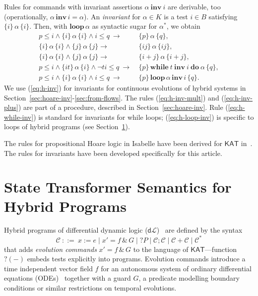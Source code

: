 \documentclass[envcountsame,envcountsect]{llncs}
\newcommand{\WHILEI}[3]{\mathbf{while}\ #1\ \mathbf{inv}\ #2\ \mathbf{do}\ #3}
\newcommand{\KAT}{\mathsf{KAT}}
\newcommand{\dL}{\mathsf{d}\mathcal{L}}
\begin{document}
Rules for commands with invariant assertions $\alpha\ \mathbf{inv}\ i$
are derivable, too (operationally,
$\alpha\, \mathbf{inv}\, i = \alpha$).  An \emph{invariant} for
$\alpha\in K$ is a test $i\in B$ satisfying $\{i\}\, \alpha\, \{i\}$.
Then, with $\mathbf{loop}\, \alpha$ as syntactic sugar for
$\alpha^\ast$, we obtain
\begin{align}
  p\le i \land \{i\}\, \alpha\, \{i\}\land i\le q\ \rightarrow\
  &\{p\}\, \alpha\, \{q\},\label{eq:h-inv}\tag{h-inv}\\
  \{i\}\, \alpha\, \{i\} \land \{j\}\, \alpha\, \{j\}\rightarrow\
  &\{i j\}\, \alpha\, \{i j\},\label{eq:h-inv-mult}\tag{h-inv-mult}\\
  \{i\}\, \alpha\, \{i\} \land \{j\}\, \alpha\, \{j\}\rightarrow\
  &\{i+ j\}\, \alpha\, \{i+ j\},\label{eq:h-inv-plus}\tag{h-inv-plus}\\
  p \le i \wedge \{it\}\, \alpha\, \{i\} \wedge \neg t i\le q\
  \rightarrow \ & \{p\}\, \WHILEI{t}{i}{\alpha}\,  \{q\},\label{eq:h-while-inv}\tag{h-while-inv}\\
   p\le i \land \{i\}\, \alpha\, \{i\}\land i\le q\ \rightarrow\ &
                                                                   \{p\}\, \mathbf{loop}\, \alpha\,
    \mathbf{inv}\, i\, \{q\}. \label{eq:h-loop-inv}\tag{h-loop-inv}
\end{align}
We use (\ref{eq:h-inv}) for invariants for continuous
evolutions of hybrid systems in Section~\ref{sec:hoare-inv}-\ref{sec:from-flows}. The rules (\ref{eq:h-inv-mult}) and (\ref{eq:h-inv-plus}) are part of a procedure, described in Section~\ref{sec:hoare-inv}. Rule (\ref{eq:h-while-inv})
is standard for  invariants for while loops;
(\ref{eq:h-loop-inv}) is specific to loops of hybrid programs (see
Section~\ref{sec:sta-hybrid}).

The rules for propositional Hoare logic in Isabelle have been derived
for $\KAT$ in~\cite{afp:kat,afp:vericomp}. The rules for invariants
have been developed specifically for this article.



\section{State Transformer Semantics for Hybrid
  Programs}\label{sec:sta-hybrid}


Hybrid programs of differential dynamic logic ($\dL$)~\cite{Platzer18}
are defined by the syntax
\begin{equation*}
\mathcal{C}\ ::= \ x:=e \mid x' = f \, \&\, G \mid ?P\mid \mathcal{C};\mathcal{C}\mid \mathcal{C}+\mathcal{C}\mid \mathcal{C}^*
\end{equation*}
that adds \emph{evolution commands} $x' = f \, \&\, G$ to the language
of $\KAT$---function $?(-)$ embeds tests explicitly into programs.
Evolution commands introduce a time independent vector field $f$ for
an autonomous system of ordinary differential equations
(ODEs)~\cite{Teschl12} together with a guard $G$, a predicate
modelling boundary conditions or similar restrictions on temporal
evolutions. %
\end{document}
